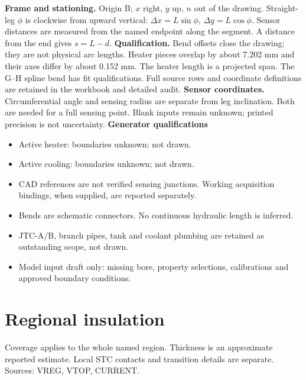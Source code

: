 \documentclass[11pt]{article}
\begin{document}
\textbf{Frame and stationing.} Origin B; $x$ right, $y$ up, $n$ out of the drawing. Straight-leg $\phi$ is clockwise from upward vertical: $\Delta x=L\sin\phi$, $\Delta y=L\cos\phi$. Sensor distances are measured from the named endpoint along the segment. A distance from the end gives $s=L-d$.
\textbf{Qualification.} Bend offsets close the drawing; they are not physical arc lengths. Heater pieces overlap by about 7.202 mm and their axes differ by about 0.152 mm. The heater length is a projected span. The G--H spline bend has fit qualifications. Full source rows and coordinate definitions are retained in the workbook and detailed audit.
\textbf{Sensor coordinates.} Circumferential angle and sensing radius are separate from leg inclination. Both are needed for a full sensing point. Blank inputs remain unknown; printed precision is not uncertainty.
\textbf{Generator qualifications}\begin{itemize}
\item Active heater: boundaries unknown; not drawn.
\item Active cooling: boundaries unknown; not drawn.
\item CAD references are not verified sensing junctions. Working acquisition bindings, when supplied, are reported separately.
\item Bends are schematic connectors. No continuous hydraulic length is inferred.
\item JTC-A/B, branch pipes, tank and coolant plumbing are retained as outstanding scope, not drawn.
\item Model input draft only: missing bore, property selections, calibrations and approved boundary conditions.
\end{itemize}
\clearpage\section{Regional insulation}\label{insulation-detail}
Coverage applies to the whole named region. Thickness is an approximate reported estimate. Local STC contacts and transition details are separate. Sources: VREG, VTOP, CURRENT.
\begingroup\small\setlength{\tabcolsep}{4pt}
\end{document}
